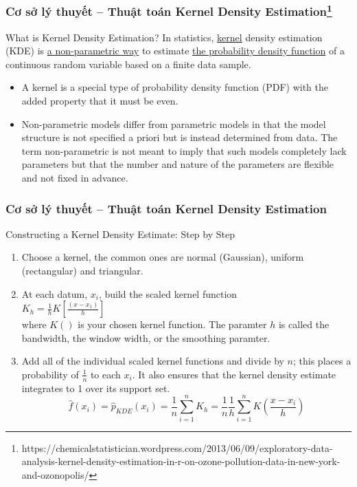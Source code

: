\documentclass[t]{beamer}
\begin{document}

\begin{frame}[t]
\frametitle{Cơ sở lý thuyết -- Thuật toán Kernel Density Estimation\footnote{https://chemicalstatistician.wordpress.com/2013/06/09/exploratory-data-analysis-kernel-density-estimation-in-r-on-ozone-pollution-data-in-new-york-and-ozonopolis/}}
\begin{block}{What is Kernel Density Estimation?}
In statistics, \underline{kernel} density estimation (KDE) is \underline{a non-parametric way} to estimate \underline{the probability density function} of a continuous random variable based on a finite data sample.
\end{block}
\begin{itemize}
\item A kernel is a special type of probability density function (PDF) with the added property that it must be even. 
\item Non-parametric models differ from parametric models in that the model structure is not specified a priori but is instead determined from data. The term non-parametric is not meant to imply that such models completely lack parameters but that the number and nature of the parameters are flexible and not fixed in advance.
\end{itemize}
\end{frame}


\begin{frame}[t]
\frametitle{Cơ sở lý thuyết -- Thuật toán Kernel Density Estimation}
Constructing a Kernel Density Estimate: Step by Step
\begin{enumerate}
\item Choose a kernel, the common ones are normal (Gaussian), uniform (rectangular) and triangular.
\item At each datum, $x_i$, build the scaled kernel function\\
$K_h = \frac{1}{h}K[\frac{(x-x_1)}{h}]$\\
where $K()$ is your chosen kernel function. The paramter $h$ is called the bandwidth, the window width, or the smoothing paramter.
\item Add all of the individual scaled kernel functions and divide by $n$; this places a probability of $\frac{1}{n}$ to each $x_i$. It also ensures that the kernel density estimate integrates to 1 over its support set.\\
\[
\hat{f}(x_i) = \hat{p}_{KDE}(x_i) = \frac{1}{n}\sum_{i=1}^{n} K_h = \frac{1}{n}\frac{1}{h}\sum_{i=1}^{n} K(\frac{x-x_i}{h})
\]
\end{enumerate}
\end{frame}
\end{document}
